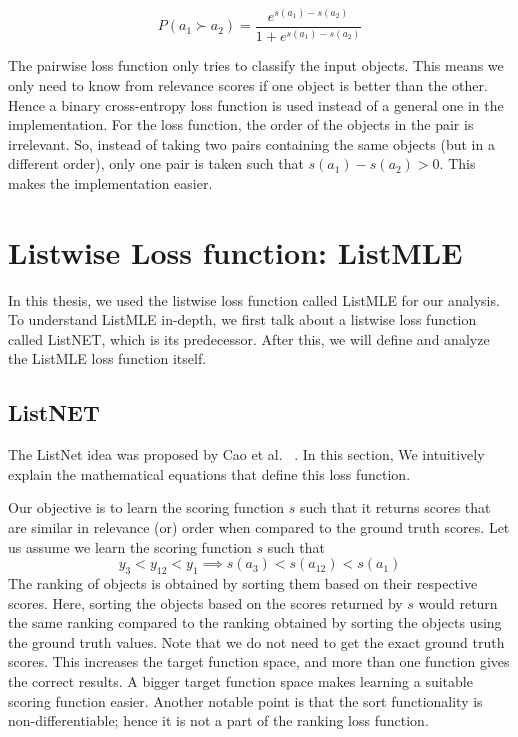 \documentclass[12pt, twoside, ngerman]{report}
\begin{document}
\begin{equation}
\label{eq:pairwiseprobability}
P(a_1 \succ a_2) = \frac{e^{s(a_1) - s(a_2)}}{1 + e^{s(a_1) - s(a_2)} }
\end{equation}


The pairwise loss function only tries to classify the input objects.
This means we only need to know from relevance scores if one object is better than the other.
Hence a binary cross-entropy loss function is used instead of a general one in the implementation.
For the loss function, the order of the objects in the pair is irrelevant.
So,  instead of taking two pairs containing the same objects (but in a different order), only one pair is taken such that $s(a_1) - s(a_2) > 0$.
This makes the implementation easier.

\section{Listwise Loss function: ListMLE}

In this thesis, we used the listwise loss function called ListMLE for our analysis. To understand ListMLE in-depth, we first talk about a listwise loss function called ListNET, which is its predecessor. After this, we will define and analyze the ListMLE loss function itself.

\subsection{ListNET}
The ListNet idea was proposed by Cao et al. ~\cite{listwisebetter}. In this section, We intuitively explain the mathematical equations that define this loss function.

Our objective is to learn the scoring function $s$ such that it returns scores that are similar in relevance (or) order when compared to the ground truth scores.
Let us assume we learn the scoring function $s$ such that
$$
y_3 < y_{12} < y_1 \implies s(a_3) < s(a_{12}) < s(a_1)
$$
The ranking of objects is obtained by sorting them based on their respective scores. Here, sorting the objects based on the scores returned by $s$ would return the same ranking compared to the ranking obtained by sorting the objects using the ground truth values.
Note that we do not need to get the exact ground truth scores.
This increases the target function space, and more than one function gives the correct results.
A bigger target function space makes learning a suitable scoring function easier.
Another notable point is that the sort functionality is non-differentiable; hence it is not a part of the ranking loss function.
\end{document}
